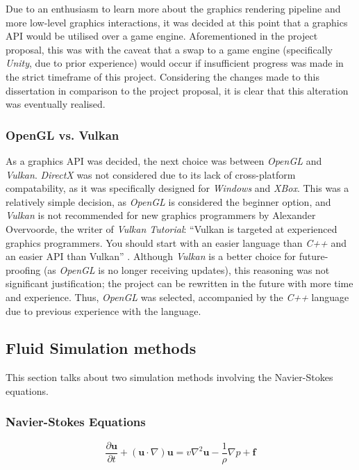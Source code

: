 \documentclass[12pt]{article}
\begin{document}
    Due to an enthusiasm to learn more about the graphics rendering pipeline and more low-level graphics interactions, it was decided at this point that a graphics API would be utilised over a game engine. Aforementioned in the project proposal, this was with the caveat that a swap to a game engine (specifically \textit{Unity}, due to prior experience) would occur if insufficient progress was made in the strict timeframe of this project. Considering the changes made to this dissertation in comparison to the project proposal, it is clear that this alteration was eventually realised.

    \subsubsection{OpenGL vs. Vulkan}

    As a graphics API was decided, the next choice was between \textit{OpenGL} and \textit{Vulkan}. \textit{DirectX} was not considered due to its lack of cross-platform compatability, as it was specifically designed for \textit{Windows} and \textit{XBox}. This was a relatively simple decision, as \textit{OpenGL} is considered the beginner option, and \textit{Vulkan} is not recommended for new graphics programmers by Alexander Overvoorde, the writer of \textit{Vulkan Tutorial}: ``Vulkan is targeted at experienced graphics programmers. You should start with an easier language than \textit{C++} and an easier API than Vulkan'' \cite{vulkancomment}. Although \textit{Vulkan} is a better choice for future-proofing (as \textit{OpenGL} is no longer receiving updates), this reasoning was not significant justification; the project can be rewritten in the future with more time and experience. Thus, \textit{OpenGL} was selected, accompanied by the \textit{C++} language due to previous experience with the language.
    
    \subsection{Fluid Simulation methods}

    This section talks about two simulation methods involving the Navier-Stokes equations.

    \subsubsection{Navier-Stokes Equations}

    \begin{equation}
        \frac{\partial{\textbf{u}}}{\partial{t}} + (\textbf{u} \cdot\nabla)\textbf{u} = v\nabla^2 \textbf{u} - \frac{1}{\rho}\nabla p + \textbf{f}
    \end{equation}
\end{document}
